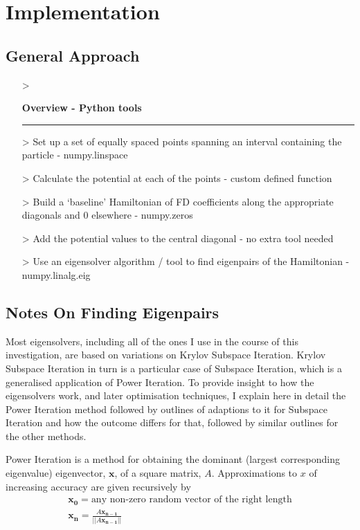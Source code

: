 \section{Implementation}
\subsection{General Approach}
\begin{itemize}
	\item[>]{\textbf{Overview - Python tools}\\ \noindent\rule{4.5cm}{0.25pt}}

    \item[>]{Set up a set of equally spaced points spanning an interval containing the particle - numpy.linspace}
    \item[>]{Calculate the potential at each of the points - custom defined function}
    \item[>]{Build a `baseline' Hamiltonian of FD coefficients along the appropriate diagonals and $0$ elsewhere - numpy.zeros}
    \item[>]{Add the potential values to the central diagonal - no extra tool needed}
    \item[>]{Use an eigensolver algorithm / tool to find eigenpairs of the Hamiltonian - numpy.linalg.eig}
\end{itemize}

\subsection{Notes On Finding Eigenpairs}
Most eigensolvers, including all of the ones I use in the course of this investigation, are based on variations on Krylov Subspace Iteration. Krylov Subspace Iteration in turn is a particular case of Subspace Iteration, which is a generalised application of Power Iteration. To provide insight to how the eigensolvers work, and later optimisation techniques, I explain here in detail the Power Iteration method followed by outlines of adaptions to it for Subspace Iteration and how the outcome differs for that, followed by similar outlines for the other methods. 


Power Iteration is a method for obtaining the dominant (largest corresponding eigenvalue) eigenvector, $\mathbf{x}$, of a square matrix, $A$. Approximations to $x$ of increasing accuracy are given recursively by
\begin{align*}
	\mathbf{x_0} = \text{any non-zero random vector of the right length}\\
	\mathbf{x_{n}} = \frac{A\mathbf{x_{n-1}}}{||A\mathbf{x_{n-1}}||}
\end{align*}

